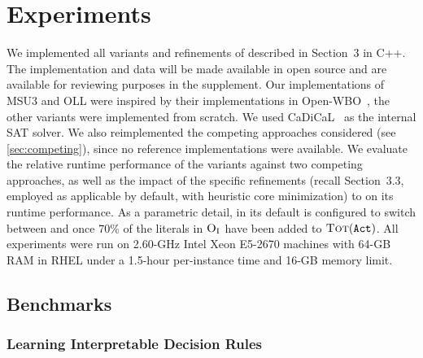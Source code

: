 \chapter{Experiments\label{chap:experiments}}

We implemented  all variants and refinements of \algname{} described in Section~3 in C++. The implementation and data will be made available in open source and are available for reviewing purposes in the supplement. Our implementations of MSU3 and OLL were inspired by their implementations in Open-WBO~\autocite{DBLP:conf/sat/MartinsML14},
the other variants were implemented from scratch.
We used CaDiCaL~\autocite{BiereFazekasFleuryHeisinger-SAT-Competition-2020-solvers} as the internal SAT solver.
We also reimplemented the competing approaches considered (see \cref{sec:competing}),
since no reference implementations were available.
We evaluate the relative runtime performance of the \algname{} variants against two competing approaches, as well
as the impact of the specific refinements (recall Section~3.3, employed as applicable by default, with heuristic core minimization) to \algname{} on its runtime performance.
As a parametric detail, in its default \msh{} is configured to switch between \msu{} and \satunsat{} once 70\% of the literals in $\textsc{O}_{\text{I}}$ have been added to $\textsc{Tot}(\texttt{Act})$.
All experiments were run on 2.60-GHz Intel Xeon E5-2670 machines with 64-GB RAM in RHEL under a 1.5-hour per-instance
time  and 16-GB memory limit. 

\section{Benchmarks\label{sec:benchmarks}}

\subsection{Learning Interpretable Decision Rules\label{sec:lidr}}

